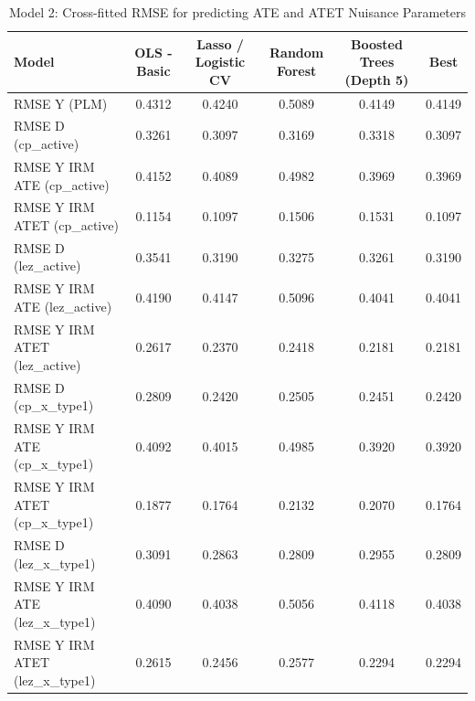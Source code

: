 \begin{table}
\caption{Model 2: Cross-fitted RMSE for predicting ATE and ATET Nuisance Parameters}
\label{tab:rmse_m2}
\begin{tabular}{lccccc}
\toprule
Model & OLS - Basic & Lasso / Logistic CV & Random Forest & Boosted Trees (Depth 5) & Best \\
\midrule
RMSE Y (PLM) & 0.4312 & 0.4240 & 0.5089 & 0.4149 & 0.4149 \\
RMSE D (cp_active) & 0.3261 & 0.3097 & 0.3169 & 0.3318 & 0.3097 \\
RMSE Y IRM ATE (cp_active) & 0.4152 & 0.4089 & 0.4982 & 0.3969 & 0.3969 \\
RMSE Y IRM ATET (cp_active) & 0.1154 & 0.1097 & 0.1506 & 0.1531 & 0.1097 \\
RMSE D (lez_active) & 0.3541 & 0.3190 & 0.3275 & 0.3261 & 0.3190 \\
RMSE Y IRM ATE (lez_active) & 0.4190 & 0.4147 & 0.5096 & 0.4041 & 0.4041 \\
RMSE Y IRM ATET (lez_active) & 0.2617 & 0.2370 & 0.2418 & 0.2181 & 0.2181 \\
RMSE D (cp_x_type1) & 0.2809 & 0.2420 & 0.2505 & 0.2451 & 0.2420 \\
RMSE Y IRM ATE (cp_x_type1) & 0.4092 & 0.4015 & 0.4985 & 0.3920 & 0.3920 \\
RMSE Y IRM ATET (cp_x_type1) & 0.1877 & 0.1764 & 0.2132 & 0.2070 & 0.1764 \\
RMSE D (lez_x_type1) & 0.3091 & 0.2863 & 0.2809 & 0.2955 & 0.2809 \\
RMSE Y IRM ATE (lez_x_type1) & 0.4090 & 0.4038 & 0.5056 & 0.4118 & 0.4038 \\
RMSE Y IRM ATET (lez_x_type1) & 0.2615 & 0.2456 & 0.2577 & 0.2294 & 0.2294 \\
\bottomrule
\end{tabular}
\end{table}
